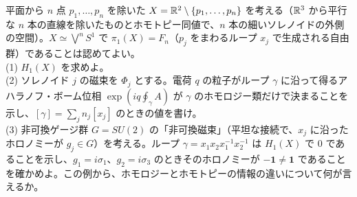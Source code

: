 \begin{problem}[難易度 C]\label{ch04-prob-hurewicz}
平面から $n$ 点 $p_1,\dots,p_n$ を除いた $X=\mathbb{R}^2\setminus\{p_1,\dots,p_n\}$ を考える（$\mathbb{R}^3$ から平行な $n$ 本の直線を除いたものとホモトピー同値で、$n$ 本の細いソレノイドの外側の空間）。$X\simeq\bigvee^nS^1$ で $\pi_1(X)=F_n$（$p_j$ をまわるループ $x_j$ で生成される自由群）であることは認めてよい。\\
(1) $H_1(X)$ を求めよ。\\
(2) ソレノイド $j$ の磁束を $\Phi_j$ とする。電荷 $q$ の粒子がループ $\gamma$ に沿って得るアハラノフ・ボーム位相 $\exp(iq\oint_\gamma A)$ が $\gamma$ のホモロジー類だけで決まることを示し、$[\gamma]=\sum_jn_j[x_j]$ のときの値を書け。\\
(3) 非可換ゲージ群 $G=SU(2)$ の「非可換磁束」（平坦な接続で、$x_j$ に沿ったホロノミーが $g_j\in G$）を考える。ループ $\gamma=x_1x_2x_1^{-1}x_2^{-1}$ は $H_1(X)$ で $0$ であることを示し、$g_1=i\sigma_1$、$g_2=i\sigma_3$ のときそのホロノミーが $-\mathbf 1\ne\mathbf 1$ であることを確かめよ。この例から、ホモロジーとホモトピーの情報の違いについて何が言えるか。
\end{problem}

